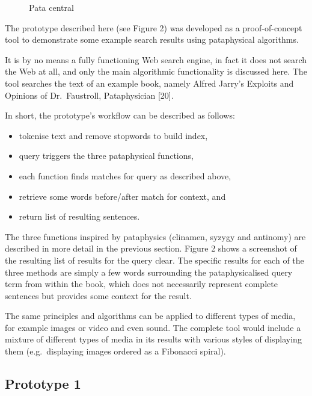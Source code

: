 \begin{figure}[htb] %
  \centering
  
\caption[Pata central]{Pata central}
\label{fig:patasearch02}
\end{figure}

The prototype described here (see Figure 2) was developed as a proof-of-concept tool to demonstrate some example search results using pataphysical algorithms.

It is by no means a fully functioning Web search engine, in fact it does not search the Web at all, and only the main algorithmic functionality is discussed here. The tool searches the text of an example book, namely Alfred Jarry’s Exploits and Opinions of Dr.\ Faustroll, Pataphysician [20].

In short, the prototype’s workflow can be described as follows:
\begin{itemize}
  \item tokenise text and remove stopwords to build index,
  \item query triggers the three pataphysical functions,
  \item each function finds matches for query as described above,
  \item retrieve some words before/after match for context, and
  \item return list of resulting sentences.
\end{itemize}

The three functions inspired by pataphysics (clinamen, syzygy and antinomy) are described in more detail in the previous section. Figure 2 shows a screenshot of the resulting list of results for the query clear. The specific results for each of the three methods are simply a few words surrounding the pataphysicalised query term from within the book, which does not necessarily represent complete sentences but provides some context for the result.

The same principles and algorithms can be applied to different types of media, for example images or video and even sound. The complete tool would include a mixture of different types of media in its results with various styles of displaying them (e.g.\ displaying images ordered as a Fibonacci spiral).

\subsection{Prototype 1}

